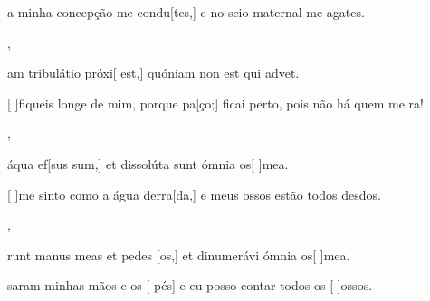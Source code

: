 {        {\item {} a minha concepção me condu[tes,] e no seio maternal me agates.},
    {\item {}am tribulátio próxi[ est,] quóniam non est qui advet.}%
        {\item {}[ ]{fi}queis longe de mim, porque pa[ço;] ficai perto, pois não há quem me ra!},
    {\item {} áqua ef[sus sum,] et dissolúta sunt ómnia os[ ]{me}a.}%
        {\item {}[ ]{me} sinto como a água derra[da,] e meus ossos estão todos desdos.},
    {\item {}runt manus meas et pedes [os,] et dinumerávi ómnia os[ ]{me}a.}%
        {\item {}saram minhas mãos e os [ pés] e eu posso contar todos os [ ]{os}sos.}
}